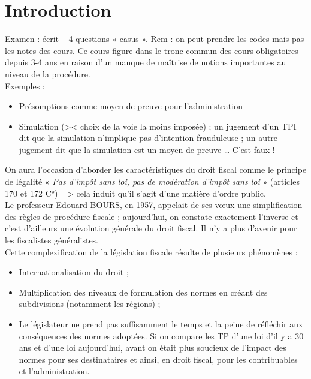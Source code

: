 \documentclass{book}
\begin{document}
\thispagestyle{empty}
\setcounter{page}{0}
\null
\newpage
{} \setcounter{page}{1} 




\tableofcontents

\chapter*{Introduction}

Examen : écrit – 4 questions « casus ». 
Rem : on peut prendre les codes mais pas les notes des cours. 
Ce cours figure dans le tronc commun des cours obligatoires depuis 3-4 ans en raison d’un manque de maîtrise de notions importantes au niveau de la procédure. \\

Exemples : 
\begin{itemize}
\item Présomptions comme moyen de preuve pour l’administration 
\item Simulation (>< choix de la voie la moins imposée) ; un jugement d’un TPI dit que la simulation n’implique pas d’intention frauduleuse ; un autre jugement dit que la simulation est un moyen de preuve … C’est faux ! 
\end{itemize}

On aura l’occasion d’aborder les caractéristiques du droit fiscal comme le principe de légalité « \textit{Pas d’impôt sans loi, pas de modération d’impôt sans loi} » (articles 170 et 172 C°) => cela induit qu’il s’agit d’une matière d’ordre public.  \\

Le professeur Edouard BOURS, en 1957, appelait de ses vœux une simplification des règles de procédure  fiscale ; aujourd’hui, on constate exactement l’inverse et c’est d’ailleurs une évolution générale du droit fiscal. Il n’y a plus d’avenir pour les fiscalistes généralistes.\\

Cette complexification de la législation fiscale résulte de plusieurs phénomènes : 
\begin{itemize}
\item Internationalisation du droit ; 
\item Multiplication des niveaux de formulation des normes en créant des subdivisions (notamment les régions) ;
\item Le législateur ne prend pas suffisamment le temps et la peine de réfléchir aux conséquences des normes adoptées. Si on compare les TP d’une loi d’il y a 30 ans et d’une loi aujourd’hui, avant on était plus soucieux de l’impact des normes pour ses destinataires et ainsi, en droit fiscal, pour les contribuables et l’administration. 
\end{itemize}
\end{document}
